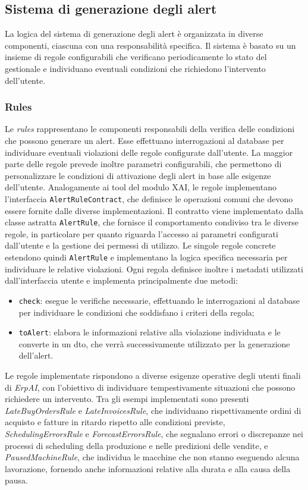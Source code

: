 \subsection{Sistema di generazione degli alert}
La logica del sistema di generazione degli alert è organizzata in diverse componenti, ciascuna con una responsabilità specifica. Il sistema è basato su un insieme di 
regole configurabili che verificano periodicamente lo stato del gestionale e individuano eventuali condizioni che richiedono l'intervento dell'utente.

\subsubsection{Rules}
Le \textit{rules} rappresentano le componenti responsabili della verifica delle condizioni che possono generare un alert. Esse effettuano interrogazioni al database per 
individuare eventuali violazioni delle regole configurate dall'utente. La maggior parte delle regole prevede inoltre parametri configurabili, che permettono di personalizzare 
le condizioni di attivazione degli alert in base alle esigenze dell'utente.
\newline
Analogamente ai tool del modulo XAI, le regole implementano l'interfaccia \texttt{AlertRuleContract}, che definisce le operazioni comuni che devono essere fornite dalle diverse 
implementazioni. Il contratto viene implementato dalla classe astratta \texttt{AlertRule}, che fornisce il comportamento condiviso tra le diverse regole, in particolare per 
quanto riguarda l'accesso ai parametri configurati dall'utente e la gestione dei permessi di utilizzo.
\newline
Le singole regole concrete estendono quindi \texttt{AlertRule} e implementano la logica specifica necessaria per individuare le relative violazioni. Ogni regola definisce 
inoltre i metadati utilizzati dall'interfaccia utente e implementa principalmente due metodi:
\begin{itemize}
\item \texttt{check}: esegue le verifiche necessarie, effettuando le interrogazioni al database per individuare le condizioni che soddisfano i criteri della regola;
\item \texttt{toAlert}: elabora le informazioni relative alla violazione individuata e le converte in un \acrfull{dto}, che verrà successivamente utilizzato per la generazione 
  dell'alert.
\end{itemize}
Le regole implementate rispondono a diverse esigenze operative degli utenti finali di \textit{ErpAI}, con l'obiettivo di individuare tempestivamente situazioni 
che possono richiedere un intervento. Tra gli esempi implementati sono presenti \textit{LateBuyOrdersRule} e \textit{LateInvoicesRule}, che individuano rispettivamente 
ordini di acquisto e fatture in ritardo rispetto alle condizioni previste, \textit{SchedulingErrorsRule} e \textit{ForecastErrorsRule}, che segnalano errori o discrepanze nei processi di scheduling della 
produzione e nelle predizioni delle vendite, e \textit{PausedMachineRule}, che individua le macchine che non stanno eseguendo alcuna lavorazione, fornendo anche informazioni relative alla durata e alla causa 
della pausa.

